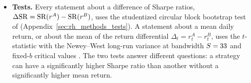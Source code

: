 \begin{itemize}
\item \textbf{Tests.} Every statement about a difference of Sharpe ratios, $\Delta\mathrm{SR} = \mathrm{SR}(r^A) - \mathrm{SR}(r^B)$, uses
  the studentized circular block bootstrap test of \citet{LedoitWolf2008} (Appendix~\ref{sec:rh_methods_tests}).
  A statement about
  a mean daily return, or about the mean of the return differential $\Delta_t = r^A_t - r^B_t$, uses the
  $t$-statistic with the Newey--West long-run variance at bandwidth $S = 33$ and fixed-$b$ critical values
  \citep{KieferVogelsang2005,LazarusLewisStockWatson2018}. The two tests answer different questions: a strategy can
  have a significantly higher Sharpe ratio than another without a significantly higher mean return.
\end{itemize}

